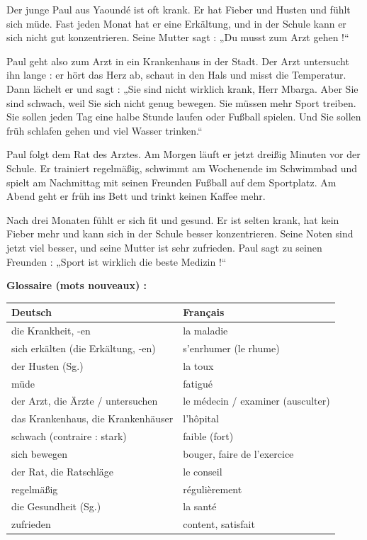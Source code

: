 \documentclass[11pt]{article}
\begin{document}
\begin{textebox}
Der junge Paul aus Yaoundé ist oft krank. Er hat Fieber und Husten und fühlt sich müde. Fast jeden Monat hat er eine Erkältung, und in der Schule kann er sich nicht gut konzentrieren. Seine Mutter sagt : „Du musst zum Arzt gehen !“

Paul geht also zum Arzt in ein Krankenhaus in der Stadt. Der Arzt untersucht ihn lange : er hört das Herz ab, schaut in den Hals und misst die Temperatur. Dann lächelt er und sagt : „Sie sind nicht wirklich krank, Herr Mbarga. Aber Sie sind schwach, weil Sie sich nicht genug bewegen. Sie müssen mehr Sport treiben. Sie sollen jeden Tag eine halbe Stunde laufen oder Fußball spielen. Und Sie sollen früh schlafen gehen und viel Wasser trinken.“

Paul folgt dem Rat des Arztes. Am Morgen läuft er jetzt dreißig Minuten vor der Schule. Er trainiert regelmäßig, schwimmt am Wochenende im Schwimmbad und spielt am Nachmittag mit seinen Freunden Fußball auf dem Sportplatz. Am Abend geht er früh ins Bett und trinkt keinen Kaffee mehr.

Nach drei Monaten fühlt er sich fit und gesund. Er ist selten krank, hat kein Fieber mehr und kann sich in der Schule besser konzentrieren. Seine Noten sind jetzt viel besser, und seine Mutter ist sehr zufrieden. Paul sagt zu seinen Freunden : „Sport ist wirklich die beste Medizin !“
\end{textebox}

\textbf{Glossaire (mots nouveaux) :}

\begin{center}
\begin{tabularx}{\linewidth}{|X|X|}
\hline
\rowcolor{popblueL} \textbf{Deutsch} & \textbf{Français} \\
\hline
die Krankheit, -en & la maladie \\
\hline
sich erkälten (die Erkältung, -en) & s'enrhumer (le rhume) \\
\hline
der Husten (Sg.) & la toux \\
\hline
müde & fatigué \\
\hline
der Arzt, die Ärzte / untersuchen & le médecin / examiner (ausculter) \\
\hline
das Krankenhaus, die Krankenhäuser & l'hôpital \\
\hline
schwach (contraire : stark) & faible (fort) \\
\hline
sich bewegen & bouger, faire de l'exercice \\
\hline
der Rat, die Ratschläge & le conseil \\
\hline
regelmäßig & régulièrement \\
\hline
die Gesundheit (Sg.) & la santé \\
\hline
zufrieden & content, satisfait \\
\hline
\end{tabularx}
\end{center}
\end{document}
